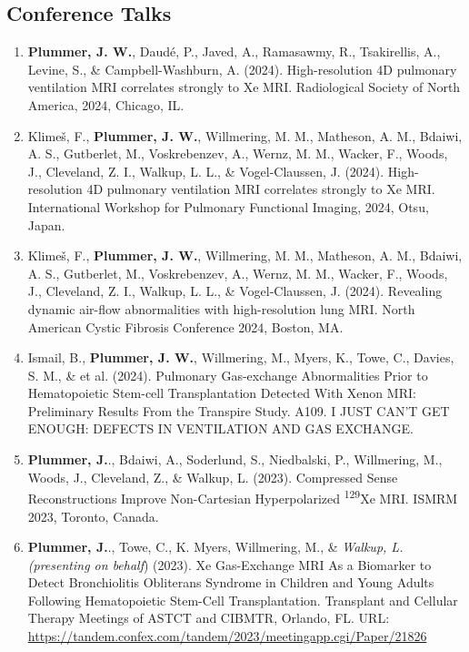 \documentclass[12pt,]{scrartcl}
\begin{document}
\subsection{Conference Talks}\label{conferences_presentations}

\begin{enumerate}
  \leftskip-0.13in %


  \item \textbf{Plummer, J. W.}, Daudé, P., Javed, A., Ramasawmy, R., Tsakirellis, A., Levine, S., \& Campbell-Washburn, A. (2024). High-resolution 4D pulmonary ventilation MRI correlates strongly to Xe MRI. Radiological Society of North America, 2024, Chicago, IL.

  \item Klimeš, F., \textbf{Plummer, J. W.}, Willmering, M. M., Matheson, A. M., Bdaiwi, A. S., Gutberlet, M., Voskrebenzev, A., Wernz, M. M., Wacker, F., Woods, J., Cleveland, Z. I., Walkup, L. L., \& Vogel-Claussen, J. (2024). High-resolution 4D pulmonary ventilation MRI correlates strongly to Xe MRI. International Workshop for Pulmonary Functional Imaging, 2024, Otsu, Japan.

  \item Klimeš, F., \textbf{Plummer, J. W.}, Willmering, M. M., Matheson, A. M., Bdaiwi, A. S., Gutberlet, M., Voskrebenzev, A., Wernz, M. M., Wacker, F., Woods, J., Cleveland, Z. I., Walkup, L. L., \& Vogel-Claussen, J. (2024). Revealing dynamic air-flow abnormalities with high-resolution lung MRI. North American Cystic Fibrosis Conference 2024, Boston, MA. 
  
  \item Ismail, B., \textbf{Plummer, J. W.}, Willmering, M., Myers, K., Towe, C., Davies, S. M., \& et al. (2024). Pulmonary Gas-exchange Abnormalities Prior to Hematopoietic Stem-cell Transplantation Detected With Xenon MRI: Preliminary Results From the Transpire Study. A109. I JUST CAN'T GET ENOUGH: DEFECTS IN VENTILATION AND GAS EXCHANGE.
  
  \item \textbf{Plummer, J.}., Bdaiwi, A., Soderlund, S., Niedbalski, P., Willmering, M., Woods, J., Cleveland, Z., \& Walkup, L. (2023). Compressed Sense Reconstructions Improve Non-Cartesian Hyperpolarized \textsuperscript{129}Xe MRI. ISMRM 2023, Toronto, Canada.
  
  \item \textbf{Plummer, J.}., Towe, C., K. Myers, Willmering, M., \&  \textit{Walkup, L. (presenting on behalf}) (2023). Xe Gas-Exchange MRI As a Biomarker to Detect Bronchiolitis Obliterans Syndrome in Children and Young Adults Following Hematopoietic Stem-Cell Transplantation. Transplant and Cellular Therapy Meetings of ASTCT and CIBMTR, Orlando, FL. URL: \href{https://tandem.confex.com/tandem/2023/meetingapp.cgi/Paper/21826}{https://tandem.confex.com/tandem/2023/meetingapp.cgi/Paper/21826}
  

\end{enumerate}
\end{document}
